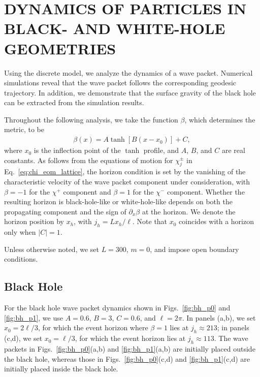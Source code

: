 \documentclass[reprint,amsmath,amssymb,aps,prb]{revtex4-2}
\begin{document}
\section{DYNAMICS OF PARTICLES IN BLACK- AND WHITE-HOLE GEOMETRIES}
\label{sec:dynamics}
Using the discrete model, we analyze the dynamics of a wave packet. Numerical simulations reveal that the wave packet follows the corresponding geodesic trajectory. In addition, we demonstrate that the surface gravity of the black hole can be extracted from the simulation results.

Throughout the following analysis, we take the function $\beta$, which determines the metric, to be
\begin{align}
\beta(x) = A\tanh\left[B(x-x_0)\right] + C,
\end{align}
where $x_0$ is the inflection point of the $\tanh$ profile, and $A$, $B$, and $C$ are real constants.
As follows from the equations of motion for $\chi_j^\pm$ in Eq.~\eqref{eq:chi_eom_lattice}, the horizon condition is set by the vanishing of the characteristic velocity of the wave packet component under consideration, with $\beta=-1$ for the $\chi^+$ component and $\beta=1$ for the $\chi^-$ component.
Whether the resulting horizon is black-hole-like or white-hole-like depends on both the propagating component and the sign of $\partial_x\beta$ at the horizon.
We denote the horizon position by $x_h$, with $j_h=Lx_h/\ell$.
Note that $x_0$ coincides with a horizon only when $|C|=1$.

Unless otherwise noted, we set $L=300$, $m=0$, and impose open boundary conditions.

\subsection{Black Hole}
For the black hole wave packet dynamics shown in Figs.~\ref{fig:bh_p0} and \ref{fig:bh_p1}, we use $A=0.6$, $B=3$, $C=0.6$, and $\ell=2\pi$. In panels (a,b), we set $x_0=2\ell/3$, for which the event horizon where $\beta=1$ lies at $j_h\approx213$; in panels (c,d), we set $x_0=\ell/3$, for which the event horizon lies at $j_h\approx113$. The wave packets in Figs.~\ref{fig:bh_p0}(a,b) and \ref{fig:bh_p1}(a,b) are initially placed outside the black hole, whereas those in Figs.~\ref{fig:bh_p0}(c,d) and \ref{fig:bh_p1}(c,d) are initially placed inside the black hole.
\end{document}
